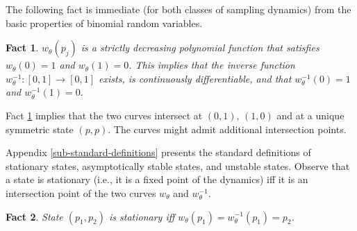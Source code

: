 \documentclass[12pt]{article}
\numberwithin{equation}{section}
\numberwithin{figure}{section}
\theoremstyle{definition}
\theoremstyle{plain}
\theoremstyle{plain}
\theoremstyle{plain}
\theoremstyle{remark}
\theoremstyle{plain}
\theoremstyle{plain}
\newtheorem{fact}{Fact}
\begin{document}
 The following fact is immediate (for both classes of sampling dynamics) from  the basic properties of  binomial random variables.
\begin{fact}\label{fact-w}
$w_\theta(p_j)$ is a 
strictly decreasing polynomial function that satisfies $w_\theta(0)=1$ and $w_\theta(1)=0$.
This implies that the inverse function $w_\theta^{-1}:[0,1]\rightarrow[0,1]$ exists, is continuously differentiable, and that $w_\theta^{-1}(0)=1$ and $w_\theta^{-1}(1)=0.$
\end{fact}
Fact \ref{fact-w} implies that the two curves intersect at $(0,1)$, $(1,0)$ and at a unique symmetric state $(p,p)$. The curves might admit additional intersection points.

Appendix \ref{sub-standard-definitions} presents the standard definitions of  stationary states, asymptotically stable states, and unstable states. Observe that a state is stationary
(i.e., it is a fixed point of the dynamics) iff it is an intersection point of the two curves $w_\theta$ and $w_\theta^{-1}$.

\begin{fact}\label{fact-intersection}
State $(p_1,p_2)$ is stationary iff $w_\theta(p_1)=w_\theta^{-1}(p_1)=p_2$.
\end{fact}
\end{document}
